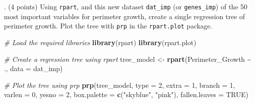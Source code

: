 \documentclass[
]{article}
\newenvironment{Shaded}{\begin{snugshade}}{\end{snugshade}}
\newcommand{\AttributeTok}[1]{\textcolor[rgb]{0.13,0.29,0.53}{#1}}
\newcommand{\CommentTok}[1]{\textcolor[rgb]{0.56,0.35,0.01}{\textit{#1}}}
\newcommand{\ConstantTok}[1]{\textcolor[rgb]{0.56,0.35,0.01}{#1}}
\newcommand{\DecValTok}[1]{\textcolor[rgb]{0.00,0.00,0.81}{#1}}
\newcommand{\FunctionTok}[1]{\textcolor[rgb]{0.13,0.29,0.53}{\textbf{#1}}}
\newcommand{\NormalTok}[1]{#1}
\newcommand{\OtherTok}[1]{\textcolor[rgb]{0.56,0.35,0.01}{#1}}
\newcommand{\SpecialCharTok}[1]{\textcolor[rgb]{0.81,0.36,0.00}{\textbf{#1}}}
\newcommand{\StringTok}[1]{\textcolor[rgb]{0.31,0.60,0.02}{#1}}
\begin{document}
\begin{Shaded}
\end{Shaded}

\vspace{2cm}


. (4 points) Using \texttt{rpart}, and this new dataset
\texttt{dat\_imp} (or \texttt{genes\_imp}) of the 50 most important
variables for perimeter growth, create a single regression tree of
perimeter growth. Plot the tree with \texttt{prp} in the
\texttt{rpart.plot} package.

\begin{Shaded}
\begin{Highlighting}[]
\CommentTok{\# Load the required libraries}
\FunctionTok{library}\NormalTok{(rpart)}
\FunctionTok{library}\NormalTok{(rpart.plot)}

\CommentTok{\# Create a regression tree using rpart}
\NormalTok{tree\_model }\OtherTok{\textless{}{-}} \FunctionTok{rpart}\NormalTok{(Perimeter\_Growth }\SpecialCharTok{\textasciitilde{}}\NormalTok{ ., }\AttributeTok{data =}\NormalTok{ dat\_imp)}

\CommentTok{\# Plot the tree using prp}
\FunctionTok{prp}\NormalTok{(tree\_model, }\AttributeTok{type =} \DecValTok{2}\NormalTok{, }\AttributeTok{extra =} \DecValTok{1}\NormalTok{, }\AttributeTok{branch =} \DecValTok{1}\NormalTok{, }\AttributeTok{varlen =} \DecValTok{0}\NormalTok{, }\AttributeTok{yesno =} \DecValTok{2}\NormalTok{,}
    \AttributeTok{box.palette =} \FunctionTok{c}\NormalTok{(}\StringTok{"skyblue"}\NormalTok{, }\StringTok{"pink"}\NormalTok{), }\AttributeTok{fallen.leaves =} \ConstantTok{TRUE}\NormalTok{)}
\end{Highlighting}
\end{Shaded}
\end{document}
